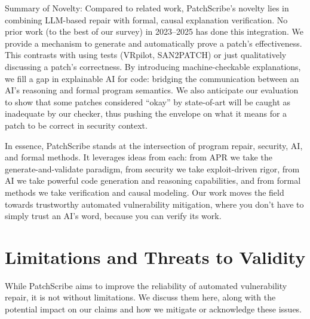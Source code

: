 \documentclass[conference,compsoc]{IEEEtran}
\begin{document}
Summary of Novelty: Compared to related work, PatchScribe's novelty lies
in combining LLM-based repair with formal, causal explanation
verification. No prior work (to the best of our survey) in 2023--2025
has done this integration. We provide a mechanism to generate and
automatically prove a patch's effectiveness. This contrasts with using
tests (VRpilot, SAN2PATCH) or just qualitatively discussing a patch's
correctness. By introducing machine-checkable explanations, we fill a
gap in explainable AI for code: bridging the communication between an
AI's reasoning and formal program semantics. We also anticipate our
evaluation to show that some patches considered ``okay'' by state-of-art
will be caught as inadequate by our checker, thus pushing the envelope
on what it means for a patch to be correct in security context.

In essence, PatchScribe stands at the intersection of program repair,
security, AI, and formal methods. It leverages ideas from each: from APR
we take the generate-and-validate paradigm, from security we take
exploit-driven rigor, from AI we take powerful code generation and
reasoning capabilities, and from formal methods we take verification and
causal modeling. Our work moves the field towards trustworthy automated
vulnerability mitigation, where you don't have to simply trust an AI's
word, because you can verify its work.

\section{Limitations and Threats to
Validity}\label{limitations-and-threats-to-validity}

While PatchScribe aims to improve the reliability of automated
vulnerability repair, it is not without limitations. We discuss them
here, along with the potential impact on our claims and how we mitigate
or acknowledge these issues.
\end{document}
